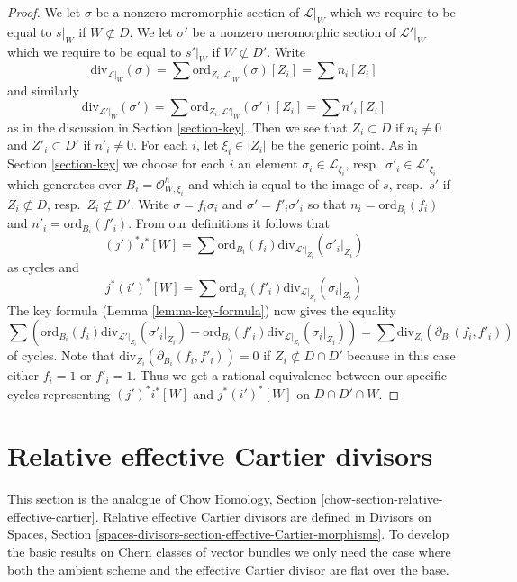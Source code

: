 \documentclass{stacks-project}
\theoremstyle{plain}
\theoremstyle{definition}
\theoremstyle{remark}
\numberwithin{equation}{subsection}
\begin{document}
\begin{proof}
\medskip\noindent
We let $\sigma$ be a nonzero meromorphic section of $\mathcal{L}|_W$
which we require to be equal to $s|_W$ if $W \not \subset D$.
We let $\sigma'$ be a nonzero meromorphic section of $\mathcal{L}'|_W$
which we require to be equal to $s'|_W$ if $W \not \subset D'$.
Write
$$
\text{div}_{\mathcal{L}|_W}(\sigma) =
\sum \text{ord}_{Z_i, \mathcal{L}|_W}(\sigma)[Z_i] = \sum n_i[Z_i]
$$
and similarly
$$
\text{div}_{\mathcal{L}'|_W}(\sigma') =
\sum \text{ord}_{Z_i, \mathcal{L}'|_W}(\sigma')[Z_i] = \sum n'_i[Z_i]
$$
as in the discussion in Section \ref{section-key}.
Then we see that $Z_i \subset D$ if $n_i \not = 0$ and
$Z'_i \subset D'$ if $n'_i \not = 0$. For each $i$, let $\xi_i \in |Z_i|$
be the generic point. As in Section \ref{section-key} we choose
for each $i$ an element
$\sigma_i \in \mathcal{L}_{\xi_i}$, resp.\ $\sigma'_i \in \mathcal{L}'_{\xi_i}$
which generates over $B_i = \mathcal{O}_{W, \xi_i}^h$
and which is equal to the image of
$s$, resp.\ $s'$ if $Z_i \not \subset D$, resp.\ $Z_i \not \subset D'$.
Write $\sigma = f_i \sigma_i$ and $\sigma' = f'_i\sigma'_i$ so that
$n_i = \text{ord}_{B_i}(f_i)$ and
$n'_i = \text{ord}_{B_i}(f'_i)$.
From our definitions it follows that
$$
(j')^*i^*[W] =
\sum \text{ord}_{B_i}(f_i) \text{div}_{\mathcal{L}'|_{Z_i}}(\sigma'_i|_{Z_i})
$$
as cycles and
$$
j^*(i')^*[W] =
\sum \text{ord}_{B_i}(f'_i) \text{div}_{\mathcal{L}|_{Z_i}}(\sigma_i|_{Z_i})
$$
The key formula (Lemma \ref{lemma-key-formula}) now gives the equality
$$
\sum \left(
\text{ord}_{B_i}(f_i) \text{div}_{\mathcal{L}'|_{Z_i}}(\sigma'_i|_{Z_i}) -
\text{ord}_{B_i}(f'_i) \text{div}_{\mathcal{L}|_{Z_i}}(\sigma_i|_{Z_i})
\right) =
\sum \text{div}_{Z_i}(\partial_{B_i}(f_i, f'_i))
$$
of cycles. Note that $\text{div}_{Z_i}(\partial_{B_i}(f_i, f'_i)) = 0$ if
$Z_i \not \subset D \cap D'$ because in this case either $f_i = 1$
or $f'_i = 1$. Thus we get a rational equivalence between our specific
cycles representing $(j')^*i^*[W]$ and $j^*(i')^*[W]$ on $D \cap D' \cap W$.
\end{proof}










\section{Relative effective Cartier divisors}
\label{section-relative-effective-cartier}

\noindent
This section is the analogue of
Chow Homology, Section \ref{chow-section-relative-effective-cartier}.
Relative effective Cartier divisors are defined
in Divisors on Spaces, Section
\ref{spaces-divisors-section-effective-Cartier-morphisms}.
To develop the basic results on Chern classes of vector bundles
we only need the case where both the ambient scheme and the effective
Cartier divisor are flat over the base.
\end{document}
